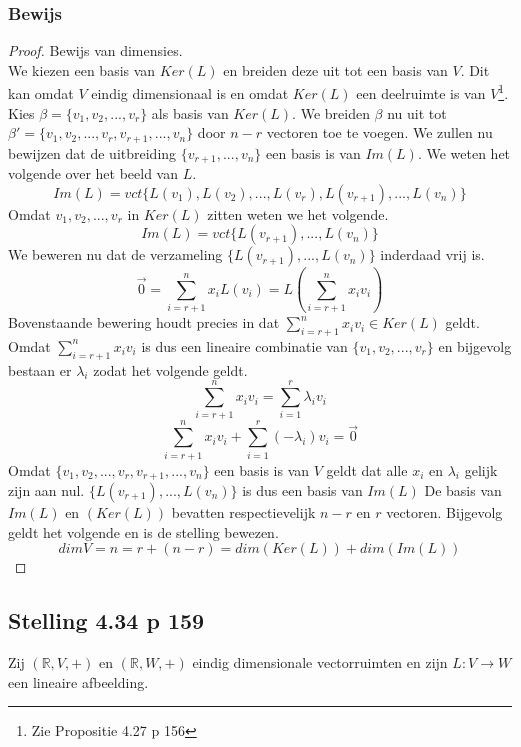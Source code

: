 \documentclass[lineaire_algebra_oplossingen.tex]{subfiles}
\begin{document}
\subsubsection*{Bewijs}
\begin{proof}
Bewijs van dimensies.\\
We kiezen een basis van $Ker(L)$ en breiden deze uit tot een basis van $V$. Dit kan omdat $V$ eindig dimensionaal is en omdat $Ker(L)$ een deelruimte is van $V$\footnote{Zie Propositie 4.27 p 156}. Kies $\beta = \{v_1,v_2,...,v_r\}$ als basis van $Ker(L)$. We breiden $\beta$ nu uit tot $\beta'= \{v_1,v_2,...,v_r,v_{r+1},...,v_{n}\}$ door $n-r$ vectoren toe te voegen. 
We zullen nu bewijzen dat de uitbreiding $\{v_{r+1},...,v_{n}\}$ een basis is van $Im(L)$. We weten het volgende over het beeld van $L$.
\[
Im(L) = vct\{L(v_1),L(v_2),...,L(v_r),L(v_{r+1}),...,L(v_{n})\}
\]
Omdat $v_1,v_2,...,v_r$ in $Ker(L)$ zitten weten we het volgende.
\[
Im(L) = vct \{L(v_{r+1}),...,L(v_{n})\}
\]
We beweren nu dat de verzameling $\{L(v_{r+1}),...,L(v_{n})\}$ inderdaad vrij is.
\[
\vec{0}=\sum_{i=r+1}^nx_iL(v_i)=L\left(\sum_{i=r+1}^nx_iv_i\right)
\]
Bovenstaande bewering houdt precies in dat $\sum_{i=r+1}^nx_iv_i\in Ker(L)$ geldt. Omdat $\sum_{i=r+1}^nx_iv_i$ is dus een lineaire combinatie van $\{v_1,v_2,...,v_r\}$ en bijgevolg bestaan er $\lambda_i$ zodat het volgende geldt.
\[
\sum_{i=r+1}^nx_iv_i = \sum_{i=1}^r\lambda_iv_i
\]
\[
\sum_{i=r+1}^nx_iv_i + \sum_{i=1}^r(-\lambda_i)v_i = \vec{0}
\]
Omdat $\{v_1,v_2,...,v_r,v_{r+1},...,v_{n}\}$ een basis is van $V$ geldt dat alle $x_i$ en $\lambda_i$ gelijk zijn aan nul. $\{L(v_{r+1}),...,L(v_{n})\}$ is dus een basis van $Im(L)$
De basis van $Im(L)$ en $(Ker(L))$ bevatten respectievelijk $n-r$ en $r$ vectoren. Bijgevolg geldt het volgende en is de stelling bewezen.
\[
dimV = n = r + (n-r) = dim(Ker(L)) + dim(Im(L))
\]
\end{proof}

\subsection{Stelling 4.34 p 159}
Zij $(\mathbb{R},V,+)$ en $(\mathbb{R},W,+)$ eindig dimensionale vectorruimten en zijn $L:V\rightarrow W$ een lineaire afbeelding.
\end{document}
